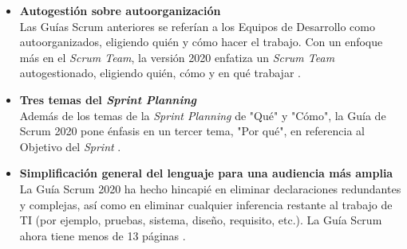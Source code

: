\begin{spacing}{1.5}
\begin{itemize}
			\item \textbf{Autogestión sobre autoorganización}\\
			Las Guías Scrum anteriores se referían a los Equipos de Desarrollo como autoorganizados, eligiendo
			quién y cómo hacer el trabajo. Con un enfoque más en el \textit{Scrum Team}, la versión 2020 enfatiza un \textit{Scrum Team} autogestionado, eligiendo quién, cómo y en qué trabajar \cite{chap2_scrum}.
			\item \textbf{Tres temas del \textit{Sprint Planning}}\\
			Además de los temas de la \textit{Sprint Planning} de "Qué" y "Cómo", la Guía de Scrum 2020 pone énfasis en un tercer tema, "Por qué", en referencia al Objetivo del \textit{Sprint} \cite{chap2_scrum}.
			\item \textbf{Simplificación general del lenguaje para una audiencia más amplia}\\
			La Guía Scrum 2020 ha hecho hincapié en eliminar declaraciones redundantes y complejas, así como en eliminar cualquier inferencia restante al trabajo de TI (por ejemplo, pruebas, sistema, diseño, requisito, etc.). La Guía Scrum ahora tiene menos de 13 páginas \cite{chap2_scrum}.
															
		\end{itemize}

\end{spacing}
